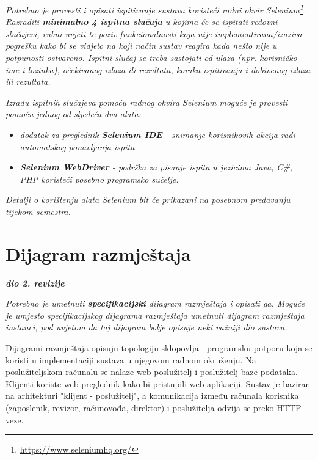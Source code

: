 			 \textit{Potrebno je provesti i opisati ispitivanje sustava koristeći radni okvir Selenium\footnote{\url{https://www.seleniumhq.org/}}. Razraditi \textbf{minimalno 4 ispitna slučaja} u kojima će se ispitati redovni slučajevi, rubni uvjeti te poziv funkcionalnosti koja nije implementirana/izaziva pogrešku kako bi se vidjelo na koji način sustav reagira kada nešto nije u potpunosti ostvareno. Ispitni slučaj se treba sastojati od ulaza (npr. korisničko ime i lozinka), očekivanog izlaza ili rezultata, koraka ispitivanja i dobivenog izlaza ili rezultata.\\ }
			 
			 \textit{Izradu ispitnih slučajeva pomoću radnog okvira Selenium moguće je provesti pomoću jednog od sljedeća dva alata:}
			 \begin{itemize}
			 	\item \textit{dodatak za preglednik \textbf{Selenium IDE} - snimanje korisnikovih akcija radi automatskog ponavljanja ispita	}
			 	\item \textit{\textbf{Selenium WebDriver} - podrška za pisanje ispita u jezicima Java, C\#, PHP koristeći posebno programsko sučelje.}
			 \end{itemize}
		 	\textit{Detalji o korištenju alata Selenium bit će prikazani na posebnom predavanju tijekom semestra.}
			
			\eject 
		
		
		\section{Dijagram razmještaja}
			
			\textbf{\textit{dio 2. revizije}}
			
			 \textit{Potrebno je umetnuti \textbf{specifikacijski} dijagram razmještaja i opisati ga. Moguće je umjesto specifikacijskog dijagrama razmještaja umetnuti dijagram razmještaja instanci, pod uvjetom da taj dijagram bolje opisuje neki važniji dio sustava.}

			 Dijagrami razmještaja opisuju topologiju sklopovlja i programsku potporu koja se koristi u implementaciji sustava u njegovom radnom okruženju. Na poslužiteljskom računalu se nalaze web poslužitelj i poslužitelj baze podataka. Klijenti koriste web preglednik kako bi pristupili web aplikaciji. Sustav je baziran na arhitekturi "klijent - poslužitelj", a komunikacija između računala korisnika (zaposlenik, revizor, računovođa, direktor) i poslužitelja odvija se preko HTTP veze.

